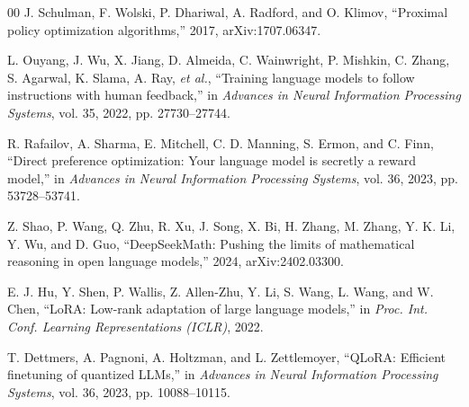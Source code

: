 \documentclass[conference]{IEEEtran}
\begin{document}
\begin{thebibliography}{00}
J. Schulman, F. Wolski, P. Dhariwal, A. Radford, and O. Klimov, ``Proximal policy optimization algorithms,'' 2017, arXiv:1707.06347.

L. Ouyang, J. Wu, X. Jiang, D. Almeida, C. Wainwright, P. Mishkin, C. Zhang, S. Agarwal, K. Slama, A. Ray, \emph{et al.}, ``Training language models to follow instructions with human feedback,'' in \emph{Advances in Neural Information Processing Systems}, vol. 35, 2022, pp. 27730--27744.

R. Rafailov, A. Sharma, E. Mitchell, C. D. Manning, S. Ermon, and C. Finn, ``Direct preference optimization: Your language model is secretly a reward model,'' in \emph{Advances in Neural Information Processing Systems}, vol. 36, 2023, pp. 53728--53741.

Z. Shao, P. Wang, Q. Zhu, R. Xu, J. Song, X. Bi, H. Zhang, M. Zhang, Y. K. Li, Y. Wu, and D. Guo, ``DeepSeekMath: Pushing the limits of mathematical reasoning in open language models,'' 2024, arXiv:2402.03300.

E. J. Hu, Y. Shen, P. Wallis, Z. Allen-Zhu, Y. Li, S. Wang, L. Wang, and W. Chen, ``LoRA: Low-rank adaptation of large language models,'' in \emph{Proc. Int. Conf. Learning Representations (ICLR)}, 2022.

T. Dettmers, A. Pagnoni, A. Holtzman, and L. Zettlemoyer, ``QLoRA: Efficient finetuning of quantized LLMs,'' in \emph{Advances in Neural Information Processing Systems}, vol. 36, 2023, pp. 10088--10115.

\end{thebibliography}
\end{document}
